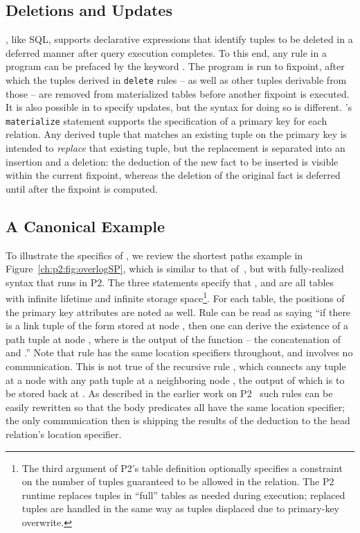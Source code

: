 \subsection{Deletions and Updates}

\OVERLOG, like SQL, supports declarative expressions that identify tuples to be
deleted in a deferred manner after query execution completes.  To this end, any
\OVERLOG rule in a program can be prefaced by the keyword .  The
program is run to fixpoint, after which the tuples derived in {\tt delete}
rules -- as well as other tuples derivable from those -- are removed from
materialized tables before another fixpoint is executed.  It is also possible
in \OVERLOG to specify updates, but the syntax for doing so is different.
\OVERLOG's {\tt materialize} statement supports the specification of a primary
key for each relation.  Any derived tuple that matches an existing tuple on the
primary key is intended to {\em replace} that existing tuple, but the
replacement is separated into an insertion and a deletion: the deduction of the
new fact to be inserted is visible within the current fixpoint, whereas the
deletion of the original fact is deferred until after the fixpoint is computed.

\subsection{A Canonical Example}
\label{ch:p2:sec:declnet}

To illustrate the specifics of \OVERLOG, we review the shortest paths example
in Figure~\ref{ch:p2:fig:overlogSP}, which is similar to that
of~\cite{loo-sigmod06}, but with fully-realized \OVERLOG syntax that runs in
P2.  The three  statements specify that , 
and  are all tables with infinite lifetime and infinite storage
space\footnote{The third argument of P2's table definition optionally specifies
a constraint on the number of tuples guaranteed to be allowed in the relation.
The P2 runtime replaces tuples in ``full'' tables as needed during execution;
replaced tuples are handled in the same way as tuples displaced due to
primary-key overwrite.}.  For each table, the positions of the primary key
attributes are noted as well.  Rule  can be read as saying ``if there is
a link tuple of the form  stored at node , then one can
derive the existence of a path tuple  at node , where
 is the output of the function  -- the concatenation of
 and .'' Note that rule  has the same location specifiers
throughout, and involves no communication.  This is not true of the recursive
rule , which connects any  tuple at a node  with any path
tuple at a neighboring node , the output of which is to be stored back at
.  As described in the earlier work on
P2~\cite{loo-sigcomm05,loo-sigmod06} such rules can be easily rewritten so that
the body predicates all have the same location specifier; the only
communication then is shipping the results of the deduction to the head
relation's location specifier.

